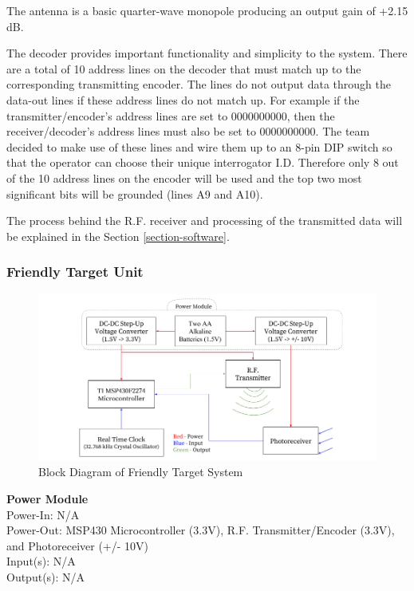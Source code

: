 \documentclass[letterpaper,10pt]{article}
\begin{document}
\begin{spacing}{1.15}
The antenna is a basic quarter-wave monopole producing an output gain of +2.15 dB.

The decoder provides important functionality and simplicity to the system. There are a total of 10 address lines on the decoder that must match up to the corresponding transmitting encoder. The lines do not output data through the data-out lines if these address lines do not match up. For example if the transmitter/encoder's address lines are set to 0000000000, then the receiver/decoder's address lines must also be set to 0000000000. The team decided to make use of these lines and wire them up to an 8-pin DIP switch so that the operator can choose their unique interrogator I.D. Therefore only 8 out of the 10 address lines on the encoder will be used and the top two most significant bits will be grounded (lines A9 and A10).

The process behind the R.F. receiver and processing of the transmitted data will be explained in the Section \ref{section-software}.

\subsubsection{Friendly Target Unit}

\begin{figure} [H]
	\centering
	\includegraphics[scale=0.50]{Friendly_Target_Block_Diagram.png}
	\caption{Block Diagram of Friendly Target System\label{fig:friendly-target-block}}
\end{figure}

\normalsize\textbf{Power Module} \\
Power-In: N/A\\
Power-Out: MSP430 Microcontroller (3.3V), R.F. Transmitter/Encoder (3.3V), and Photoreceiver (+/- 10V)\\
Input(s): N/A\\
Output(s): N/A


\end{spacing}
\end{document}
